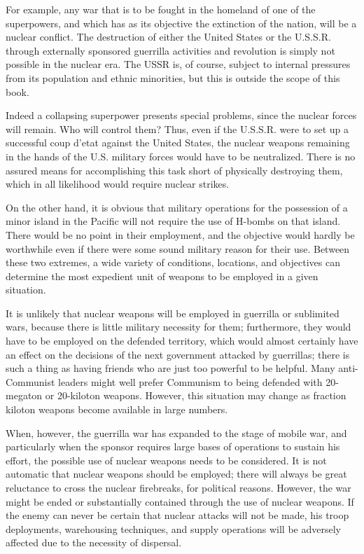 For example, any war that is to be fought in the homeland of one of the superpowers, and which has as its objective the extinction of the nation, will be a nuclear conflict. The destruction of either the United States or the U.S.S.R. through externally sponsored guerrilla activities and revolution is simply not possible in the nuclear era. The USSR is, of course, subject to internal pressures from its population and ethnic minorities, but this is outside the scope of this book.

Indeed a collapsing superpower presents special problems, since the nuclear forces will remain. Who will control them? Thus, even if the U.S.S.R. were to set up a successful coup d'etat against the United States, the nuclear weapons remaining in the hands of the U.S. military forces would have to be neutralized. There is no assured means for accomplishing this task short of physically destroying them, which in all likelihood would require nuclear strikes.

On the other hand, it is obvious that military operations for the possession of a minor island in the Pacific will not require the use of H-bombs on that island. There would be no point in their employment, and the objective would hardly be worthwhile even if there were some sound military reason for their use. Between these two extremes, a wide variety of conditions, locations, and objectives can determine the most expedient unit of weapons to be employed in a given situation.

It is unlikely that nuclear weapons will be employed in guerrilla or sublimited wars, because there is little military necessity for them; furthermore, they would have to be employed on the defended territory, which would almost certainly have an effect on the decisions of the next government attacked by guerrillas; there is such a thing as having friends who are just too powerful to be helpful. Many anti-Communist leaders might well prefer Communism to being defended with 20-megaton or 20-kiloton weapons. However, this situation may change as fraction kiloton weapons become available in large numbers.

When, however, the guerrilla war has expanded to the stage of mobile war, and particularly when the sponsor requires large bases of operations to sustain his effort, the possible use of nuclear weapons needs to be considered. It is not automatic that nuclear weapons should be employed; there will always be great reluctance to cross the nuclear firebreaks, for political reasons. However, the war might be ended or substantially contained through the use of nuclear weapons. If the enemy can never be certain that nuclear attacks will not be made, his troop deployments, warehousing techniques, and supply operations will be adversely affected due to the necessity of dispersal.

